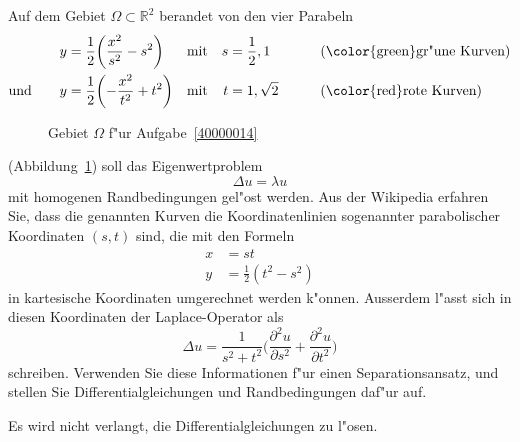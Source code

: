 Auf dem Gebiet $\Omega\subset\mathbb R^2$ berandet von den vier Parabeln
\[
\begin{aligned}
y&=\frac12\biggl( \frac{x^2}{s^2}-s^2\biggr)&&\text{mit}&s&=\frac12,1
	&&\qquad\text{({\color{green}gr"une} Kurven)}\\
\text{und}\qquad
y&=\frac12\biggl(-\frac{x^2}{t^2}+t^2\biggr)&&\text{mit}&t&=1,\sqrt{2}
	&&\qquad\text{({\color{red}rote} Kurven)}
\end{aligned}
\]
\begin{figure}
\centering
{}
\caption{Gebiet $\Omega$ f"ur Aufgabe~\ref{40000014}
\label{40000014:domain}}
\end{figure}%
(Abbildung~\ref{40000014:domain})
soll das Eigenwertproblem
\begin{equation}
\Delta u = \lambda u
\label{40000014:dgl}
\end{equation}
mit homogenen Randbedingungen gel"ost werden.
Aus der Wikipedia erfahren Sie, dass die genannten Kurven 
die Koordinatenlinien sogenannter parabolischer Koordinaten $(s,t)$ sind,
die mit den Formeln
\begin{align*}
x&=st\\
y&=\frac12(t^2-s^2)
\end{align*}
in kartesische Koordinaten umgerechnet werden k"onnen.
Ausserdem l"asst sich in diesen Koordinaten der Laplace-Operator als
\[
\Delta u = \frac1{s^2 + t^2}\biggl(\frac{\partial^2 u}{\partial s^2}+\frac{\partial^2u}{\partial t^2}\biggr)
\]
schreiben.
Verwenden Sie diese Informationen f"ur einen Separationsansatz, und
stellen Sie Differentialgleichungen und Randbedingungen daf"ur auf.

\begin{hinweis}
Es wird nicht verlangt, die Differentialgleichungen zu l"osen.
\end{hinweis}

